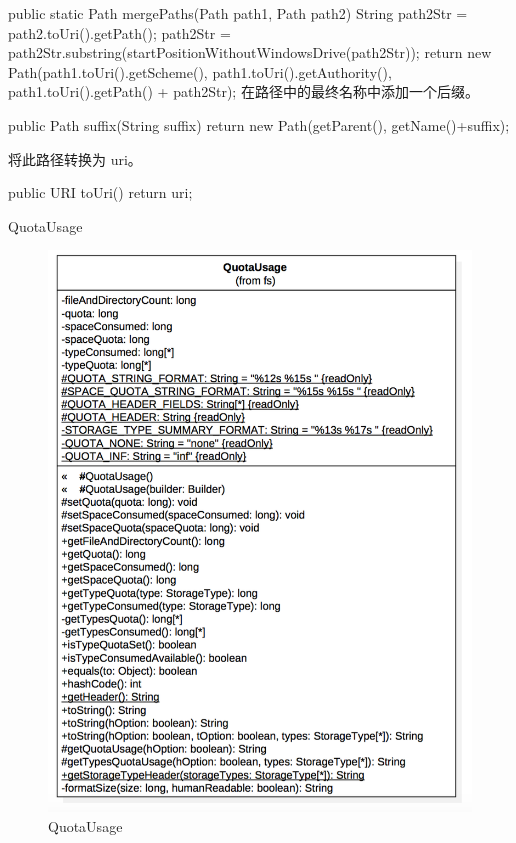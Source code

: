 \begin{java}
public static Path mergePaths(Path path1, Path path2) {
  String path2Str = path2.toUri().getPath();
  path2Str = path2Str.substring(startPositionWithoutWindowsDrive(path2Str));
  return new Path(path1.toUri().getScheme(),
      path1.toUri().getAuthority(),
      path1.toUri().getPath() + path2Str);
}
在路径中的最终名称中添加一个后缀。
\begin{java}
public Path suffix(String suffix) {
  return new Path(getParent(), getName()+suffix);
}
\end{java}
将此路径转换为 uri。
\begin{java}
public URI toUri() { return uri; }
\end{java}

QuotaUsage

\begin{figure}[h]
\centering
\includegraphics[width =1\linewidth]{8.png}
\caption{QuotaUsage}
\label{fig:QuotaUsage}
\end{figure}


\end{java}
